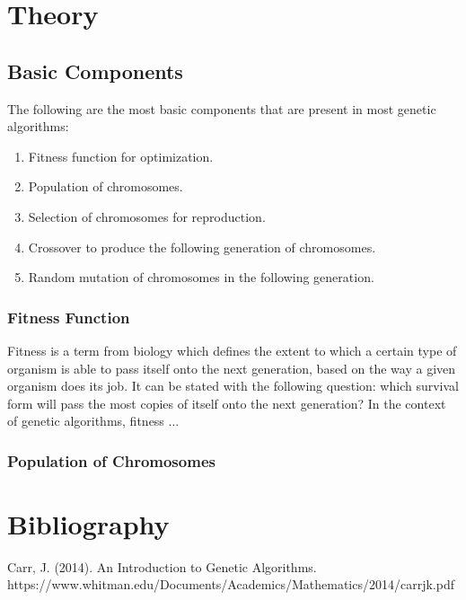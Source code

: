 \documentclass{article}
\begin{document}
\section{Theory}
\subsection{Basic Components}
The following are the most basic components that are present in most genetic algorithms:
\begin{enumerate}
    \item Fitness function for optimization.
    \item Population of chromosomes.
    \item Selection of chromosomes for reproduction.
    \item Crossover to produce the following generation of chromosomes.
    \item Random mutation of chromosomes in the following generation.
\end{enumerate}
\medbreak
\subsubsection{Fitness Function}
Fitness is a term from biology which defines the extent to which a certain type of organism is able to pass itself onto the next generation, based on the way a given organism does its job. It can be stated with the following question: which survival form will pass the most copies of itself onto the next generation?
\smallbreak
In the context of genetic algorithms, fitness ...
\subsubsection{Population of Chromosomes}

\bigbreak
\section{Bibliography}
Carr, J. (2014). An Introduction to Genetic Algorithms. https://www.whitman.edu/Documents/Academics/Mathematics/2014/carrjk.pdf

‌
\end{document}
